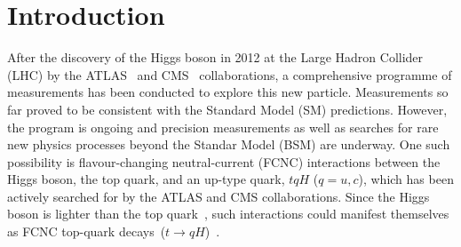 \section{Introduction}
\label{sec:intro}
After the discovery of the Higgs boson in 2012 at the Large Hadron Collider (LHC) by the ATLAS~\cite{Aad:2012tfa} and 
CMS~\cite{Chatrchyan:2012ufa} collaborations, 
a comprehensive programme of measurements %
has been conducted to explore this new particle. Measurements so far proved to be consistent with the Standard Model (SM) predictions. 
However, the program is ongoing and precision measurements as well as searches for rare new physics processes beyond the Standar Model (BSM)
are underway. One such possibility is flavour-changing neutral-current (FCNC) interactions between the Higgs boson, 
the top quark, and an up-type quark, $tqH$ ($q=u, c$), which has been actively searched for by the ATLAS and CMS collaborations.  
Since the Higgs boson is lighter than the top quark~\cite{Aad:2015zhl},
such interactions could manifest themselves as FCNC top-quark decays~($t\to qH$)~\cite{Agashe:2013hma}.


